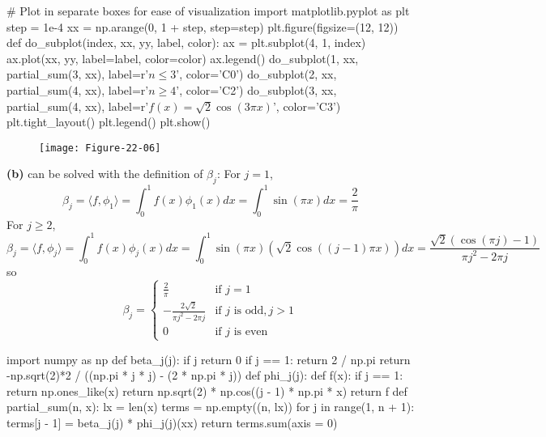 \begin{python}
# Plot in separate boxes for ease of visualization
import matplotlib.pyplot as plt
step = 1e-4
xx = np.arange(0, 1 + step, step=step)
plt.figure(figsize=(12, 12))
def do_subplot(index, xx, yy, label, color):
    ax = plt.subplot(4, 1, index)
    ax.plot(xx, yy, label=label, color=color)
    ax.legend()    
do_subplot(1, xx, partial_sum(3,  xx), label=r'$n \leq 3$', color='C0')
do_subplot(2, xx, partial_sum(4,  xx), label=r'$n \geq 4$', color='C2')
do_subplot(3, xx, partial_sum(4,  xx), 
    label=r'$f(x) = \sqrt{2} \cos (3 \pi x)$', color='C3')
plt.tight_layout()
plt.legend()
plt.show()
\end{python}

\begin{figure}[H]
\centering
\texttt{[image: Figure-22-06]}
\end{figure}

\textbf{(b)} can be solved with the definition of \(\beta_{j}\):
For \(j = 1\),
\[
\beta_{j} = \langle f, \phi_{1} \rangle = \int_{0}^{1} f(x) \phi_{1}(x) dx = \int_{0}^{1} \sin(\pi x) dx = \frac{2}{\pi}
\]
For \(j \geq 2\),
\[
\beta_{j} = \langle f, \phi_{j} \rangle = \int_{0}^{1} f(x) \phi_{j}(x) dx = \int_{0}^{1} \sin(\pi x) \left( \sqrt{2} \cos((j-1) \pi x) \right) dx = \frac{\sqrt{2} (\cos(\pi j) - 1)}{\pi j^{2} - 2 \pi j }
\]
so
\[
\beta_{j} = \begin{cases}
\frac{2}{\pi} & \text{if } j = 1\\
-\frac{2\sqrt{2}}{\pi j^{2} - 2 \pi j} & \text{if } j \text{ is odd}, j > 1 \\
0 & \text{if } j \text{ is even}
\end{cases}
\]

\begin{python}
import numpy as np
def beta_{j}(j):
    if j %
        return 0
    if j == 1:
        return 2 / np.pi
    return -np.sqrt(2)*2 / ((np.pi * j * j) - (2 * np.pi * j))
def phi_{j}(j):
    def f(x):
        if j == 1:
            return np.ones_like(x)
        return np.sqrt(2) * np.cos((j - 1) * np.pi * x)
    return f
def partial_sum(n, x):
    lx = len(x)
    terms = np.empty((n, lx))
    for j in range(1, n + 1):
        terms[j - 1] = beta_{j}(j) * phi_{j}(j)(xx)
    return terms.sum(axis = 0)
\end{python}


